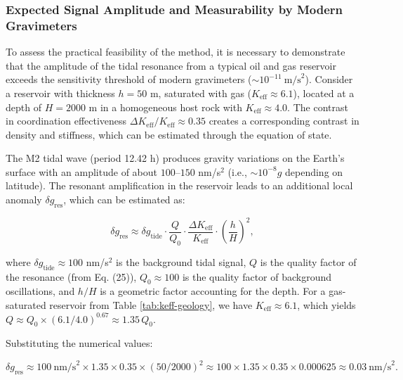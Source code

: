 \documentclass[12pt,a4paper]{article}
\theoremstyle{remark}
\newcommand{\Keff}{K_{\mathrm{eff}}}
\begin{document}
	\subsubsection{Expected Signal Amplitude and Measurability by Modern Gravimeters}
	\label{subsubsec:signal_amplitude}
	
	To assess the practical feasibility of the method, it is necessary to demonstrate that the amplitude of the tidal resonance from a typical oil and gas reservoir exceeds the sensitivity threshold of modern gravimeters (\( \sim 10^{-11}\ \text{m/s}^2\)). Consider a reservoir with thickness \(h = 50\) m, saturated with gas (\(\Keff \approx 6.1\)), located at a depth of \(H = 2000\) m in a homogeneous host rock with \(\Keff \approx 4.0\). The contrast in coordination effectiveness \(\Delta \Keff / \Keff \approx 0.35\) creates a corresponding contrast in density and stiffness, which can be estimated through the equation of state.
	
	The M2 tidal wave (period 12.42 h) produces gravity variations on the Earth's surface with an amplitude of about \(100\)–\(150\) nm/s\(^2\) (i.e., \(\sim 10^{-8} g\) depending on latitude). The resonant amplification in the reservoir leads to an additional local anomaly \(\delta g_{\text{res}}\), which can be estimated as:
	
	\begin{equation}
		\delta g_{\text{res}} \approx \delta g_{\text{tide}} \cdot \frac{Q}{Q_0} \cdot \frac{\Delta \Keff}{\Keff} \cdot \left(\frac{h}{H}\right)^2,
		\label{eq:signal_estimate}
	\end{equation}
	
	where \(\delta g_{\text{tide}} \approx 100\) nm/s\(^2\) is the background tidal signal, \(Q\) is the quality factor of the resonance (from Eq. (25)), \(Q_0 \approx 100\) is the quality factor of background oscillations, and \(h/H\) is a geometric factor accounting for the depth. For a gas-saturated reservoir from Table \ref{tab:keff-geology}, we have \(\Keff \approx 6.1\), which yields \(Q \approx Q_0 \times (6.1/4.0)^{0.67} \approx 1.35\,Q_0\).
	
	Substituting the numerical values:
	
	\[
	\delta g_{\text{res}} \approx 100\ \text{nm/s}^2 \times 1.35 \times 0.35 \times (50/2000)^2 \approx 100 \times 1.35 \times 0.35 \times 0.000625 \approx 0.03\ \text{nm/s}^2.
	\]
	
\end{document}
